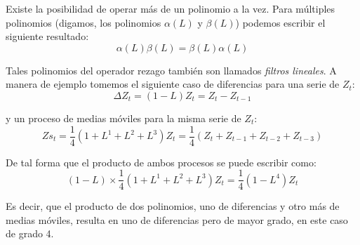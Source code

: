 \documentclass[
]{book}
\begin{document}
Existe la posibilidad de operar más de un polinomio a la vez. Para múltiples polinomios (digamos, los polinomios \(\alpha(L)\) y \(\beta(L)\)) podemos escribir el siguiente resultado:
\begin{equation}
    \alpha(L) \beta(L) = \beta(L) \alpha(L)
    \label{eq:Diff7}
\end{equation}

Tales polinomios del operador rezago también son llamados \emph{filtros lineales}. A manera de ejemplo tomemos el siguiente caso de diferencias para una serie de \(Z_t\):
\begin{equation}
    \Delta Z_{t} = (1 - L) Z_{t} = Z_{t} - Z_{t-1} 
    \label{eq:Diff8}
\end{equation}

y un proceso de medias móviles para la misma serie de \(Z_t\):
\begin{equation}
    Zs_{t} = \frac{1}{4}(1 + L^1 + L^2 + L^3) Z_{t} = \frac{1}{4}(Z_{t} + Z_{t-1} + Z_{t-2} + Z_{t-3}) 
    \label{eq:Diff9}
\end{equation}

De tal forma que el producto de ambos procesos se puede escribir como:
\begin{equation}
(1 - L) \times \frac{1}{4}(1 + L^1 + L^2 + L^3) Z_{t} = \frac{1}{4}(1 - L^4) Z_{t}
\label{eq:Diff10}
\end{equation}

Es decir, que el producto de dos polinomios, uno de diferencias y otro más de medias móviles, resulta en uno de diferencias pero de mayor grado, en este caso de grado 4.

  
\end{document}
